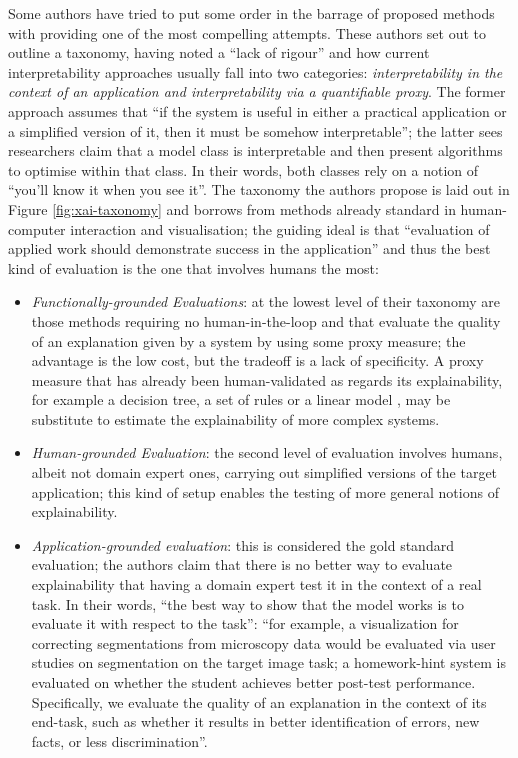 Some authors have tried to put some order in the barrage of proposed methods with \citet{doshi2017towards} providing one of the most compelling attempts.
These authors set out to outline a taxonomy, having noted a \enquote{lack of rigour} and how current interpretability approaches usually fall into two categories: \textit{interpretability in the context of an application and interpretability via a quantifiable proxy}.
 The former approach assumes that \enquote{if the system is useful in either a practical application or a simplified version of it, then it must be somehow interpretable}; the latter sees researchers claim that a model class is interpretable and then present algorithms to optimise within that class.
 In their words, both classes rely on a notion of \enquote{you'll know it when you see it}.
 The taxonomy the authors propose is laid out in Figure \ref{fig:xai-taxonomy} and borrows from methods already standard in human-computer interaction and visualisation; the guiding ideal is that \enquote{evaluation of applied work should demonstrate success in the application} and thus the best kind of evaluation is the one that involves humans the most:
 \begin{itemize}
  \item \textit{Functionally-grounded Evaluations}: at the lowest level of their taxonomy are those methods requiring no human-in-the-loop and that evaluate the quality of an explanation given by a system by using some proxy measure; the advantage is the low cost, but the tradeoff is a lack of specificity.
 A proxy measure that has already been human-validated as regards its explainability, for example a decision tree, a set of rules or a linear model \citep{guidotti2018survey}, may be substitute to estimate the explainability of more complex systems.
 \item \textit{Human-grounded Evaluation}: the second level of evaluation involves humans, albeit not domain expert ones, carrying out simplified versions of the target application; this kind of setup enables the testing of more general notions of explainability.
 \item \textit{Application-grounded evaluation}: this is considered the gold standard evaluation; the authors claim that there is no better way to evaluate explainability that having a domain expert test it in the context of a real task.
In their words, \enquote{the best way to show that the model works is to evaluate it with respect to the task}: \enquote{for example, a visualization for correcting segmentations from microscopy data would be evaluated via user studies on segmentation on the target image task; a homework-hint system is evaluated on whether the student achieves better post-test performance.  Specifically, we evaluate the quality of an explanation in the context of its end-task, such as whether it results in better identification of errors, new facts, or less discrimination}.
\end{itemize}
  
